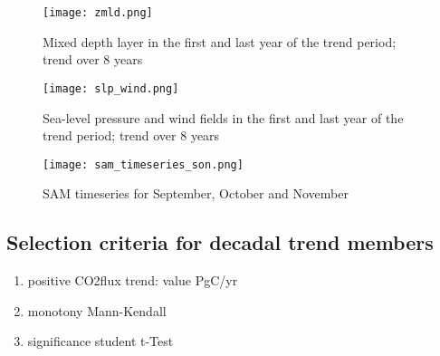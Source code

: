 \documentclass[12pt]{article}
\begin{document}
\begin{figure}
\texttt{[image: zmld.png]} %
\caption{Mixed depth layer in the first and last year of the trend period; trend over 8 years}
\label{fig:zmld}
\end{figure}

\begin{figure}
\texttt{[image: slp\_wind.png]} %
\caption{Sea-level pressure and wind fields in the first and last year of the trend period; trend over 8 years}
\label{fig:slp_wind}
\end{figure}

\begin{figure}
\texttt{[image: sam\_timeseries\_son.png]} %
\caption{SAM timeseries for September, October and November}
\label{fig:sam}
\end{figure}

\newpage
\subsection*{Selection criteria for decadal trend members}
\begin{enumerate}
\item positive CO2flux trend: value PgC/yr
\item monotony Mann-Kendall
\item significance student t-Test
\end{enumerate}
\end{document}
